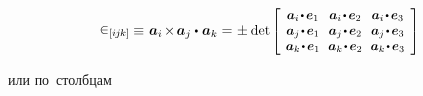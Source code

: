 \begin{otherlanguage}{russian}
\nopagebreak\vspace{-0.2em}\begin{equation*}
\permutationsparitysymbols{i\hspace{-0.1ex}j\hspace{-0.1ex}k} \hspace{-0.1ex}
\equiv \hspace{.16ex} \bm{a}_i \hspace{-0.25ex} \times \hspace{-0.25ex} \bm{a}_j \dotp \hspace{.1ex} \bm{a}_k =
\hspace{.1ex} \pm \hspace{.1ex} \operatorname{det}\hspace{-0.1ex}
\scalebox{0.92}[0.92]{$\left[\hspace{-0.2ex}\begin{array}{c@{\hspace{.64em}}c@{\hspace{.64em}}c}
\bm{a}_i \narrowdotp\hspace{.12ex} \bm{e}_1 & \bm{a}_i \narrowdotp\hspace{.12ex} \bm{e}_2 & \bm{a}_i \narrowdotp\hspace{.12ex} \bm{e}_3 \\
\bm{a}_j \narrowdotp\hspace{.12ex} \bm{e}_1 & \bm{a}_j \narrowdotp\hspace{.12ex} \bm{e}_2 & \bm{a}_j \narrowdotp\hspace{.12ex} \bm{e}_3 \\
\bm{a}_k \narrowdotp\hspace{.12ex} \bm{e}_1 & \bm{a}_k \narrowdotp\hspace{.12ex} \bm{e}_2 & \bm{a}_k \narrowdotp\hspace{.12ex} \bm{e}_3
\end{array}\hspace{-0.12ex}\right]$}
\end{equation*}

\vspace{-0.2em}\noindent
или по~столбцам


\end{otherlanguage}
